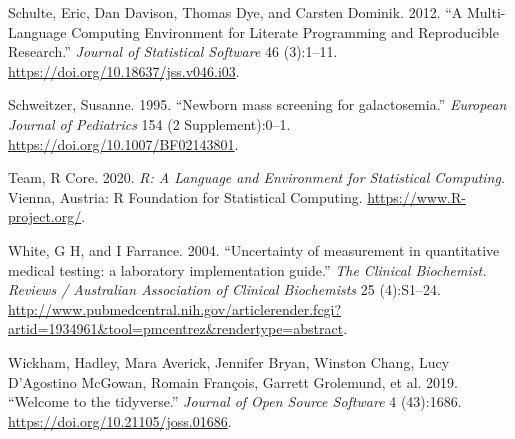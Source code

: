 \documentclass[review]{elsarticle}
\begin{document}
\begin{hangparas}{1.5em}{1}
\hypertarget{citeproc_bib_item_8}{Schulte, Eric, Dan Davison, Thomas Dye, and Carsten Dominik. 2012. “A Multi-Language Computing Environment for Literate Programming and Reproducible Research.” \textit{Journal of Statistical Software} 46 (3):1–11. \href{https://doi.org/10.18637/jss.v046.i03}{https://doi.org/10.18637/jss.v046.i03}.}

\hypertarget{citeproc_bib_item_9}{Schweitzer, Susanne. 1995. “Newborn mass screening for galactosemia.” \textit{European Journal of Pediatrics} 154 (2 Supplement):0–1. \href{https://doi.org/10.1007/BF02143801}{https://doi.org/10.1007/BF02143801}.}

\hypertarget{citeproc_bib_item_10}{Team, R Core. 2020. \textit{R: A Language and Environment for Statistical Computing}. Vienna, Austria: R Foundation for Statistical Computing. \href{https://www.R-project.org/}{https://www.R-project.org/}.}

\hypertarget{citeproc_bib_item_11}{White, G H, and I Farrance. 2004. “Uncertainty of measurement in quantitative medical testing: a laboratory implementation guide.” \textit{The Clinical Biochemist. Reviews / Australian Association of Clinical Biochemists} 25 (4):S1–24. \href{http://www.pubmedcentral.nih.gov/articlerender.fcgi?artid=1934961&tool=pmcentrez&rendertype=abstract}{http://www.pubmedcentral.nih.gov/articlerender.fcgi?artid=1934961\&tool=pmcentrez\&rendertype=abstract}.}

\hypertarget{citeproc_bib_item_12}{Wickham, Hadley, Mara Averick, Jennifer Bryan, Winston Chang, Lucy D’Agostino McGowan, Romain François, Garrett Grolemund, et al. 2019. “Welcome to the tidyverse.” \textit{Journal of Open Source Software} 4 (43):1686. \href{https://doi.org/10.21105/joss.01686}{https://doi.org/10.21105/joss.01686}.}
\end{hangparas}
\end{document}
